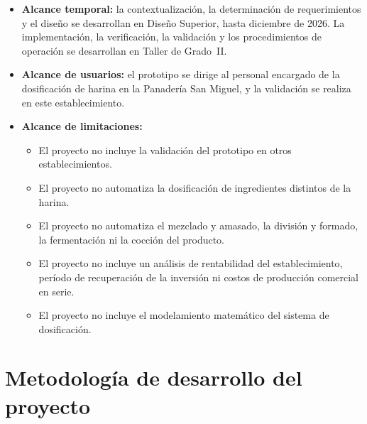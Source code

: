 \begin{itemize}
    \item \textbf{Alcance temporal:} la contextualización, la determinación
    de requerimientos y el diseño se desarrollan en Diseño Superior, hasta
    diciembre de 2026. La implementación, la verificación, la validación y
    los procedimientos de operación se desarrollan en Taller de Grado~II.

    \item \textbf{Alcance de usuarios:} el prototipo se dirige al personal
    encargado de la dosificación de harina en la Panadería San Miguel, y la
    validación se realiza en este establecimiento.

    \item \textbf{Alcance de limitaciones:}
    \begin{itemize}
        \item El proyecto no incluye la validación del prototipo en otros
        establecimientos.
        \item El proyecto no automatiza la dosificación de ingredientes
        distintos de la harina. %
        \item El proyecto no automatiza el mezclado y amasado, la división y
        formado, la fermentación ni la cocción del producto.
        \item El proyecto no incluye un análisis de rentabilidad del
        establecimiento, período de recuperación de la inversión ni costos de
        producción comercial en serie.
        \item El proyecto no incluye el modelamiento matemático del sistema
        de dosificación. %
    \end{itemize}

\end{itemize}


\section{Metodología de desarrollo del proyecto}
\label{sec:metodologia}


